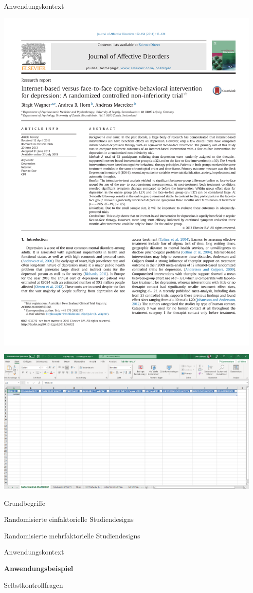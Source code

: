 \documentclass[
  8pt,
  ignorenonframetext,
]{beamer}
\begin{document}
\begin{frame}[t]{Anwendungskontext}
\protect\hypertarget{anwendungskontext-17}{}
\begin{center}\includegraphics[width=0.5\linewidth]{8_Abbildungen/alm_8_article_title} \end{center}
\vspace{2mm}

\begin{center}\includegraphics[width=0.8\linewidth]{8_Abbildungen/alm_8_article_data_sharing} \end{center}
\end{frame}

\begin{frame}[plain]{}
\protect\hypertarget{section-7}{}
\vfill
\large
{}

Grundbegriffe

Randomisierte einfaktorielle Studiendesigns

Randomisierte mehrfaktorielle Studiendesigns

Anwendungskontext

\textbf{Anwendungsbeispiel}

Selbstkontrollfragen \vfill
\end{frame}
\end{document}
